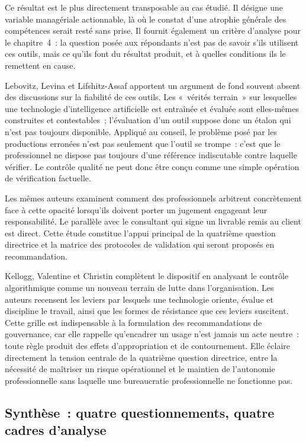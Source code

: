 Ce résultat est le plus directement transposable au cas étudié. Il désigne une variable
managériale actionnable, là où le constat d'une atrophie générale des compétences serait
resté sans prise. Il fournit également un critère d'analyse pour le chapitre~4~: la question
posée aux répondants n'est pas de savoir s'ils utilisent ces outils, mais ce qu'ils font du
résultat produit, et à quelles conditions ils le remettent en cause.

Lebovitz, Levina et Lifshitz-Assaf \cite{lebovitz2021} apportent un argument de fond
souvent absent des discussions sur la fiabilité de ces outils. Les «~vérités terrain~» sur
lesquelles une technologie d'intelligence artificielle est entraînée et évaluée sont
elles-mêmes construites et contestables~; l'évaluation d'un outil suppose donc un étalon qui
n'est pas toujours disponible. Appliqué au conseil, le problème posé par les productions
erronées n'est pas seulement que l'outil se trompe~: c'est que le professionnel ne dispose
pas toujours d'une référence indiscutable contre laquelle vérifier. Le contrôle qualité ne peut donc être conçu comme une simple
opération de vérification factuelle.

Les mêmes auteurs \cite{lebovitz2022} examinent comment des professionnels arbitrent
concrètement face à cette opacité lorsqu'ils doivent porter un jugement engageant leur
responsabilité. Le parallèle avec le consultant qui signe un livrable remis au client est
direct. Cette étude constitue l'appui principal de la quatrième question directrice et la
matrice des protocoles de validation qui seront proposés en recommandation.

Kellogg, Valentine et Christin \cite{kellogg2020} complètent le dispositif en analysant le
contrôle algorithmique comme un nouveau terrain de lutte dans l'organisation. Les auteurs
recensent les leviers par lesquels une technologie oriente, évalue et discipline le travail,
ainsi que les formes de résistance que ces leviers suscitent. Cette grille est
indispensable à la formulation des recommandations de gouvernance, car elle rappelle
qu'encadrer un usage n'est jamais un acte neutre~: toute règle produit des effets
d'appropriation et de contournement. Elle éclaire directement la tension centrale de la
quatrième question directrice, entre la nécessité de maîtriser un risque opérationnel et le
maintien de l'autonomie professionnelle sans laquelle une bureaucratie professionnelle ne
fonctionne pas.

\subsection{Synthèse~: quatre questionnements, quatre cadres d'analyse}

